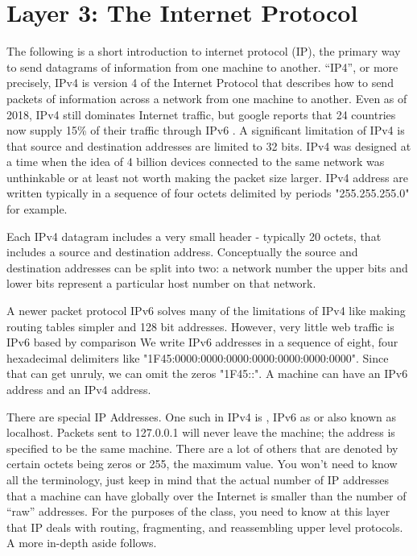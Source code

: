 \section{Layer 3: The Internet Protocol}

The following is a short introduction to internet protocol (IP), the primary way to send datagrams of information from one machine to another.
``IP4'', or more precisely, \gls{IPv4} is version 4 of the Internet Protocol that describes how to send \gls{packets} of information across a network from one machine to another.
Even as of 2018, IPv4 still dominates Internet traffic, but google reports that 24 countries now supply 15\% of their traffic through IPv6 \cite{internet_society_2018}.
A significant limitation of IPv4 is that source and destination addresses are limited to 32 bits.
IPv4 was designed at a time when the idea of 4 billion devices connected to the same network was unthinkable or at least not worth making the packet size larger.
\gls{IPv4 address} are written typically in a sequence of four octets delimited by periods "255.255.255.0" for example.

Each IPv4 \gls{datagram} includes a very small header - typically 20 \gls{octets}, that includes a source and destination address.
Conceptually the source and destination addresses can be split into two: a network number the upper bits and lower bits represent a particular host number on that network.

A newer packet protocol \gls{IPv6} solves many of the limitations of IPv4 like making routing tables simpler and 128 bit addresses.
However, very little web traffic is IPv6 based by comparison \cite{internet_society_2018}
We write IPv6 addresses in a sequence of eight, four hexadecimal delimiters like "1F45:0000:0000:0000:0000:0000:0000:0000".
Since that can get unruly, we can omit the zeros "1F45::". A machine can have an IPv6 address and an IPv4 address.

There are special IP Addresses.
One such in IPv4 is , IPv6 as  or  also known as localhost.
Packets sent to 127.0.0.1 will never leave the machine; the address is specified to be the same machine.
There are a lot of others that are denoted by certain octets being zeros or 255, the maximum value. You won't need to know all the terminology, just keep in mind that the actual number of IP addresses that a machine can have globally over the Internet is smaller than the number of ``raw'' addresses.
For the purposes of the class, you need to know at this layer that IP deals with routing, fragmenting, and reassembling upper level protocols. A more in-depth aside follows.

